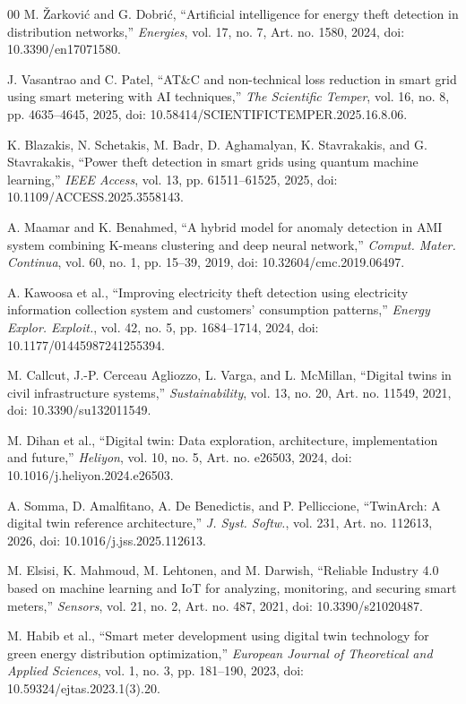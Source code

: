\documentclass{ieeeaccess}
\begin{document}
\begin{thebibliography}{00}
M. Žarković and G. Dobrić,
``Artificial intelligence for energy theft detection in distribution networks,''
\textit{Energies},
vol. 17, no. 7, Art. no. 1580, 2024,
doi: 10.3390/en17071580.

J. Vasantrao and C. Patel,
``AT\&C and non-technical loss reduction in smart grid using smart metering with AI techniques,''
\textit{The Scientific Temper},
vol. 16, no. 8, pp. 4635--4645, 2025,
doi: 10.58414/SCIENTIFICTEMPER.2025.16.8.06.

K. Blazakis, N. Schetakis, M. Badr, D. Aghamalyan, K. Stavrakakis, and G. Stavrakakis,
``Power theft detection in smart grids using quantum machine learning,''
\textit{IEEE Access},
vol. 13, pp. 61511--61525, 2025,
doi: 10.1109/ACCESS.2025.3558143.

A. Maamar and K. Benahmed,
``A hybrid model for anomaly detection in AMI system combining K-means clustering and deep neural network,''
\textit{Comput. Mater. Continua},
vol. 60, no. 1, pp. 15--39, 2019,
doi: 10.32604/cmc.2019.06497.

A. Kawoosa et al.,
``Improving electricity theft detection using electricity information collection system and customers' consumption patterns,''
\textit{Energy Explor. Exploit.},
vol. 42, no. 5, pp. 1684--1714, 2024,
doi: 10.1177/01445987241255394.

M. Callcut, J.-P. Cerceau Agliozzo, L. Varga, and L. McMillan,
``Digital twins in civil infrastructure systems,''
\textit{Sustainability},
vol. 13, no. 20, Art. no. 11549, 2021,
doi: 10.3390/su132011549.

M. Dihan et al.,
``Digital twin: Data exploration, architecture, implementation and future,''
\textit{Heliyon},
vol. 10, no. 5, Art. no. e26503, 2024,
doi: 10.1016/j.heliyon.2024.e26503.

A. Somma, D. Amalfitano, A. De Benedictis, and P. Pelliccione,
``TwinArch: A digital twin reference architecture,''
\textit{J. Syst. Softw.},
vol. 231, Art. no. 112613, 2026,
doi: 10.1016/j.jss.2025.112613.

M. Elsisi, K. Mahmoud, M. Lehtonen, and M. Darwish,
``Reliable Industry 4.0 based on machine learning and IoT for analyzing, monitoring, and securing smart meters,''
\textit{Sensors},
vol. 21, no. 2, Art. no. 487, 2021,
doi: 10.3390/s21020487.

M. Habib et al.,
``Smart meter development using digital twin technology for green energy distribution optimization,''
\textit{European Journal of Theoretical and Applied Sciences},
vol. 1, no. 3, pp. 181--190, 2023,
doi: 10.59324/ejtas.2023.1(3).20.


\end{thebibliography}
\end{document}
